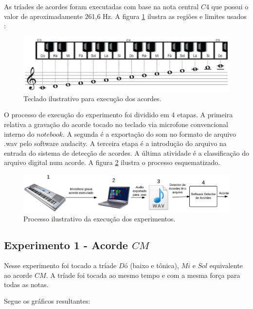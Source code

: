\newpage
As tríades de acordes foram executadas com base na nota central $C4$ que possui o valor de aproximadamente 261,6 Hz. A figura \ref{fig:teclado} ilustra as regiões e limites usados \cite{teclado}:

\begin{figure}[h]
	\centering
		\includegraphics[keepaspectratio=true,scale=0.4]{figuras/teclado-tcc1.eps}
	\caption{Teclado ilustrativo para execução dos acordes.}
  \label{fig:teclado}
\end{figure}

O processo de execução do experimento foi dividido em 4 etapas. A primeira relativa a gravação do acorde tocado no teclado via microfone convencional interno do $notebook$. A segunda é a exportação do som no formato de arquivo .wav pelo software audacity. A terceira etapa é a introdução do arquivo na entrada do sistema de detecção de acordes. A última atividade é a classificação do arquivo digital num acorde. A figura \ref{fig:processo} ilustra o processo esquematizado.

\begin{figure}[h]
	\centering
		\includegraphics[keepaspectratio=true,scale=0.35]{figuras/processo_experimento.eps}
	\caption{Processo ilustrativo da execução dos experimentos.}
  \label{fig:processo}
\end{figure}

\newpage
\subsection{Experimento 1 - Acorde $CM$}
\label{sec:experimento1}

Nesse experimento foi tocado a tríade $Dó$ (baixo e tônica), $Mi$ e $Sol$ equivalente ao acorde $CM$. A tríade foi tocada ao mesmo tempo e com a mesma força para todas as notas.

Segue os gráficos resultantes:

